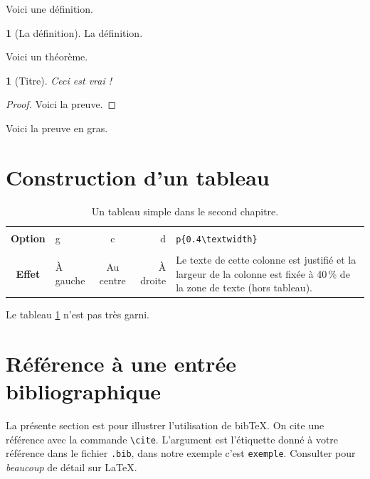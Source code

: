 \documentclass[12pt,twoside,maitrise]{dms}
\newtheorem{theo}[cor]{\theoremname}
\theoremstyle{definition}
\newtheorem{deff}[cor]{\definitionname}
\numberwithin{equation}{section}
\numberwithin{table}{chapter}
\numberwithin{figure}{chapter}
\begin{document}
Voici une définition.
\begin{deff}[La définition]
    La définition.
\end{deff}
Voici un théorème.
\begin{theo}[Titre]
    Ceci est vrai !
\end{theo}
\begin{proof}
    Voici la preuve.
\end{proof}
\begin{demo}
    Voici la preuve en gras.
\end{demo}

\section{Construction d'un tableau}

\begin{table}[htb]
    \centering
    \begin{tabular}{|c||l|c|r|p{}|}
        \hline            &            &            &            &                                                                                                                            \\
        \textbf{Option}    & g            & c            & d            & \verb|p{0.4\textwidth}|                                                                                                    \\[3mm]
        \hline\hline    &            &            &            &                                                                                                                            \\
        \textbf{Effet}    & À gauche    & Au centre    & À droite    & Le texte de cette colonne est justifié et la largeur de la colonne est fixée à 40\,\% de la zone de texte (hors tableau).    \\[3mm]
        \hline
    \end{tabular}
    \caption{Un tableau simple dans le second chapitre.}
    \label{tab:simple2}
\end{table}
Le tableau \ref{tab:simple2} n'est pas très garni.

\section{Référence à une entrée bibliographique}

La présente section est pour illustrer l'utilisation de
bib\TeX. On cite une référence avec la commande \verb|\cite|.
L'argument est l'étiquette donné à votre référence dans
le fichier \texttt{.bib}, dans notre exemple c'est \texttt{exemple}.
Consulter \cite{exemple} pour \textit{beaucoup} de détail sur \LaTeX.
\end{document}
